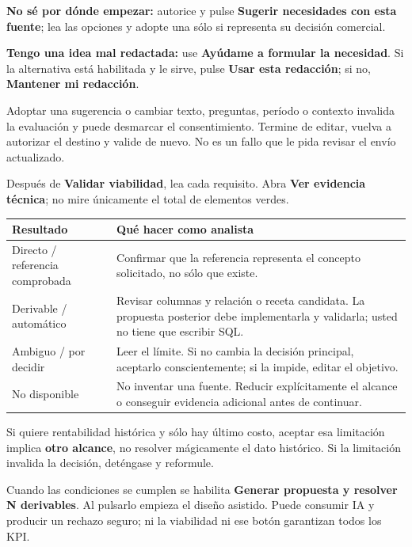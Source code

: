 \textbf{No sé por dónde empezar:} autorice y pulse \textbf{Sugerir necesidades con esta fuente}; lea las opciones y adopte una sólo si representa su decisión comercial.

\textbf{Tengo una idea mal redactada:} use \textbf{Ayúdame a formular la necesidad}. Si la alternativa está habilitada y le sirve, pulse \textbf{Usar esta redacción}; si no, \textbf{Mantener mi redacción}.
\begin{note}
Adoptar una sugerencia o cambiar texto, preguntas, período o contexto invalida la evaluación y puede desmarcar el consentimiento. Termine de editar, vuelva a autorizar el destino y valide de nuevo. No es un fallo que le pida revisar el envío actualizado.
\end{note}

Después de \textbf{Validar viabilidad}, lea cada requisito. Abra \textbf{Ver evidencia técnica}; no mire únicamente el total de elementos verdes.
\begin{tabularx}{\linewidth}{@{}p{38mm}Y@{}}
\toprule
\textbf{Resultado}&\textbf{Qué hacer como analista}\\
\midrule
Directo / referencia comprobada&Confirmar que la referencia representa el concepto solicitado, no sólo que existe.\\
Derivable / automático&Revisar columnas y relación o receta candidata. La propuesta posterior debe implementarla y validarla; usted no tiene que escribir SQL.\\
Ambiguo / por decidir&Leer el límite. Si no cambia la decisión principal, aceptarlo conscientemente; si la impide, editar el objetivo.\\
No disponible&No inventar una fuente. Reducir explícitamente el alcance o conseguir evidencia adicional antes de continuar.\\
\bottomrule
\end{tabularx}
\begin{note}
Si quiere rentabilidad histórica y sólo hay último costo, aceptar esa limitación implica \textbf{otro alcance}, no resolver mágicamente el dato histórico. Si la limitación invalida la decisión, deténgase y reformule.
\end{note}
Cuando las condiciones se cumplen se habilita \textbf{Generar propuesta y resolver N derivables}. Al pulsarlo empieza el diseño asistido. Puede consumir IA y producir un rechazo seguro; ni la viabilidad ni ese botón garantizan todos los KPI.

